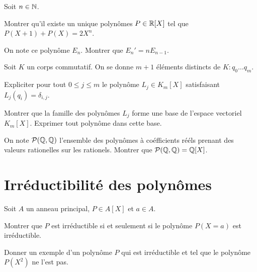 \documentclass[french]{report}
\begin{document}
\begin{exo}
    Soit \(n\in\mathbb{N}\).
    \begin{q}{1}
        Montrer qu'il existe un unique polynômes \(P\in\mathbb{R}[X]\) tel que
        \(P(X+1)+P(X) = 2X^n\).
    \end{q}
    \begin{q}{2}
        On note ce polynôme \(E_n\). Montrer que \(E_n'=nE_{n-1}\).
    \end{q}
\end{exo}

\begin{exo}
    Soit \(K\) un corps commutatif. On se donne \(m+1\) éléments distincts de \(K\colon
    q_0\dots q_m\).
    \begin{q}{1}
        Expliciter pour tout \(0\leq j\leq m\) le polynôme \(L_j\in K_m[X]\)
        satisfaisant \(L_j(q_i) = \delta_{i,j}\).
    \end{q}
    \begin{q}{2}
        Montrer que la famille des polynômes \(L_j\) forme une base de l'espace vectoriel
        \(K_m[X]\). Exprimer tout polynôme dans cette base.
    \end{q}
    \begin{q}{3}
        On note \(\mathcal{P}(\mathbb{Q}, \mathbb{Q})\) l'ensemble des polynômes à coéfficients rééls prenant des valeurs
        rationelles sur les rationels. Montrer que \(\mathcal{P}(\mathbb{Q}, \mathbb{Q})=\mathbb{Q}[X]\).
    \end{q}
\end{exo}

\section*{Irréductibilité des polynômes}

\begin{exo}
    Soit \(A\) un anneau principal, \(P\in A[X]\) et \(a\in A\).
    \begin{q}{1}
        Montrer que \(P\) est irréductible si et seulement si le polynôme \(P(X=a)\)
        est irréductible.
    \end{q}
    \begin{q}{2}
        Donner un exemple d'un polynôme \(P\) qui est irréductible et tel que le
        polynôme \(P(X^2)\) ne l'est pas.
    \end{q}
\end{exo}
\end{document}
